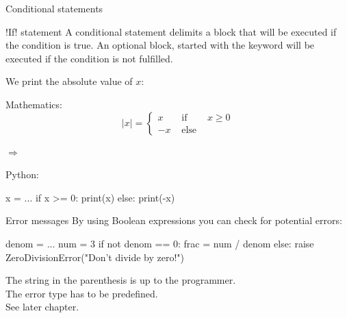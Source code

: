 \documentclass[hyperref={pdfpagelabels=false},table, handout]{beamer}
\begin{document}
\begin{frame}[fragile]{Conditional statements}
\begin{alertblock}{\pyth!If! statement}
A conditional statement delimits a \alert{block} that will be executed if the condition is true. An \alert{optional} block, started with the keyword  will be executed if the condition is not fulfilled.
\end{alertblock}
\begin{example}%
We print the absolute value of $x$:\\[0.5cm]
\begin{minipage}[c]{0.4\textwidth}
Mathematics:\\
\[
|x| = \left \{
\begin{aligned}
 x & \text{  if } &x \ge 0 \\
-x & \text{  else } &
\end{aligned}
\right .
\]
\vfill
\end{minipage}
\hfill $\Longrightarrow$ \hfill
\begin{minipage}[c]{0.4\textwidth}
Python:
\begin{python}
x = ...
if x >= 0:
  print(x)
else:
  print(-x)
\end{python}
\end{minipage}
\end{example}
\end{frame}

\begin{frame}[fragile]{Error messages}
By using Boolean expressions you can check for potential errors:
\begin{python}
denom = ...
num = 3
if not denom == 0:
   frac = num / denom
else:
   raise ZeroDivisionError("Don't divide by zero!")
\end{python}

The string in the parenthesis is up to the programmer. \\
The error type has to be predefined. \\ \hfill {\footnotesize See later chapter}.
\end{frame}
\end{document}

